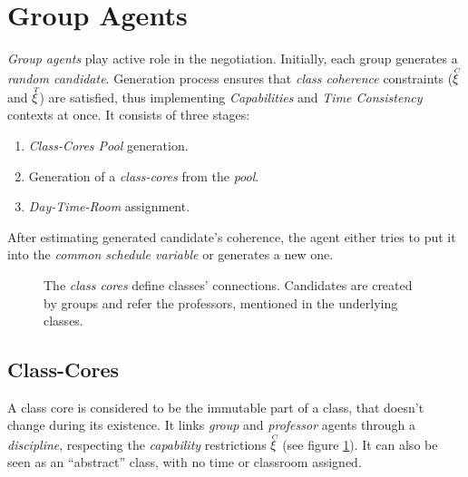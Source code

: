 \documentclass[../../header]{subfiles}
\begin{document}
\providecommand{\rootdir}{../..}


\section{Group Agents}

\emph{Group agents} play active role in the negotiation.
Initially, each group generates a \emph{random candidate}.
Generation process ensures that \emph{class coherence} constraints
($\accentset{C}{\xi}$ and $\accentset{T}{\xi}$) are satisfied, thus implementing \textit{Capabilities}
and \textit{Time Consistency} contexts at once. It consists of three stages:
\begin{enumerate}
  \item \emph{Class-Cores Pool} generation.
  \item Generation of a \emph{class-cores} from the \emph{pool}.
  \item \emph{Day-Time-Room} assignment.
\end{enumerate}


\noindent
After estimating generated candidate's coherence, the agent either tries to put
it into the \emph{common schedule variable} or generates a new one.



\begin{figure}[H]
  \centering
  
  \caption[Class cores and candidates]
          {The \emph{class cores} define classes' connections. Candidates are
           created by groups and refer the professors, mentioned in the
           underlying classes. }
  \label{fig:class-cores}
\end{figure}

\subsection{Class-Cores}
\label{sec:solution-CC}

A class core is considered to be the immutable part of a class, that doesn't
change during its existence. It links \emph{group} and \emph{professor} agents
through a \emph{discipline}, respecting the \emph{capability} restrictions $\accentset{C}{\xi}$
(see figure \ref{fig:class-cores}).
It can also be seen as an ``abstract'' class, with no time or classroom assigned.
\end{document}
